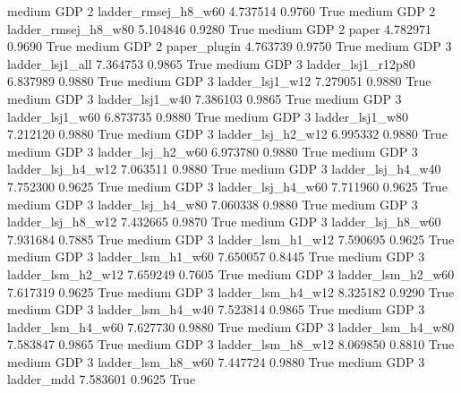     medium      GDP                 2    ladder_rmsej_h8_w60   4.737514      0.9760    True
    medium      GDP                 2    ladder_rmsej_h8_w80   5.104846      0.9280    True
    medium      GDP                 2                  paper   4.782971      0.9690    True
    medium      GDP                 2           paper_plugin   4.763739      0.9750    True
    medium      GDP                 3        ladder_lsj1_all   7.364753      0.9865    True
    medium      GDP                 3     ladder_lsj1_r12p80   6.837989      0.9880    True
    medium      GDP                 3        ladder_lsj1_w12   7.279051      0.9880    True
    medium      GDP                 3        ladder_lsj1_w40   7.386103      0.9865    True
    medium      GDP                 3        ladder_lsj1_w60   6.873735      0.9880    True
    medium      GDP                 3        ladder_lsj1_w80   7.212120      0.9880    True
    medium      GDP                 3      ladder_lsj_h2_w12   6.995332      0.9880    True
    medium      GDP                 3      ladder_lsj_h2_w60   6.973780      0.9880    True
    medium      GDP                 3      ladder_lsj_h4_w12   7.063511      0.9880    True
    medium      GDP                 3      ladder_lsj_h4_w40   7.752300      0.9625    True
    medium      GDP                 3      ladder_lsj_h4_w60   7.711960      0.9625    True
    medium      GDP                 3      ladder_lsj_h4_w80   7.060338      0.9880    True
    medium      GDP                 3      ladder_lsj_h8_w12   7.432665      0.9870    True
    medium      GDP                 3      ladder_lsj_h8_w60   7.931684      0.7885    True
    medium      GDP                 3      ladder_lsm_h1_w12   7.590695      0.9625    True
    medium      GDP                 3      ladder_lsm_h1_w60   7.650057      0.8445    True
    medium      GDP                 3      ladder_lsm_h2_w12   7.659249      0.7605    True
    medium      GDP                 3      ladder_lsm_h2_w60   7.617319      0.9625    True
    medium      GDP                 3      ladder_lsm_h4_w12   8.325182      0.9290    True
    medium      GDP                 3      ladder_lsm_h4_w40   7.523814      0.9865    True
    medium      GDP                 3      ladder_lsm_h4_w60   7.627730      0.9880    True
    medium      GDP                 3      ladder_lsm_h4_w80   7.583847      0.9865    True
    medium      GDP                 3      ladder_lsm_h8_w12   8.069850      0.8810    True
    medium      GDP                 3      ladder_lsm_h8_w60   7.447724      0.9880    True
    medium      GDP                 3             ladder_mdd   7.583601      0.9625    True
